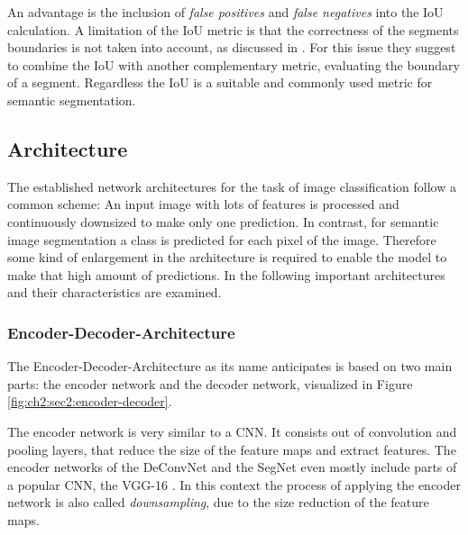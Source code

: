 An advantage is the inclusion of \textit{false positives} and \textit{false negatives} into the IoU calculation.
A limitation of the IoU metric is that the correctness of the segments boundaries is not taken into account, as discussed in \cite{Csu13-EvalMetric}. 
For this issue they suggest to combine the IoU with another complementary metric, evaluating the boundary of a segment.
Regardless the IoU is a suitable and commonly used metric for semantic segmentation.



\subsection{Architecture}\label{ord:ch2:sec2:subsec3}
The established network architectures for the task of image classification follow a common scheme: 
An input image with lots of features is processed and continuously downsized to make only one prediction.
In contrast, for semantic image segmentation a class is predicted for each pixel of the image.
Therefore some kind of enlargement in the architecture is required to enable the model to make that high amount of predictions.
In the following important architectures and their characteristics are examined.

\subsubsection{Encoder-Decoder-Architecture}
The Encoder-Decoder-Architecture as its name anticipates is based on two main parts: the encoder network and the decoder network, visualized in Figure \ref{fig:ch2:sec2:encoder-decoder}.

The encoder network is very similar to a CNN.
It consists out of convolution and pooling layers, that reduce the size of the feature maps and extract features.
The encoder networks of the DeConvNet \cite{NHH15-DeConvNet} and the SegNet \cite{Bad17-EncoderDecoder} even mostly include parts of a popular CNN, the VGG-16 \cite{SZ15-VGG16}. 
In this context the process of applying the encoder network is also called \textit{downsampling}, due to the size reduction of the feature maps.

